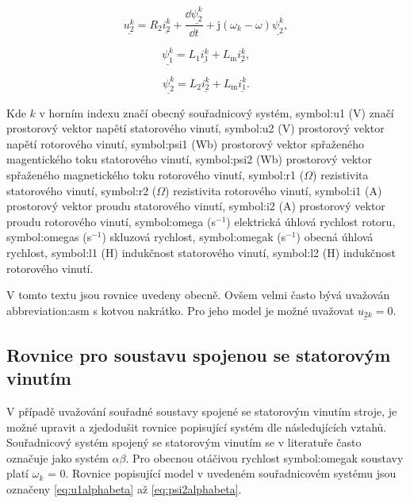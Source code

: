 \documentclass[a4paper, twoside, 11pt]{article}
\begin{document}
    \begin{equation}
        \underline{u_{2}^{k}} = R_2 \underline{i_2^{k}} + \frac{\dd{\underline{\psi_2^{k}}}}{\dd{t}} + \text{j} (\omega_k - \omega) \underline{\psi_2^{k}},
    \end{equation}

    \begin{equation}
        \underline{\psi_1^{k}} = L_1 \underline{i_1^{k}} + L_\text{m} \underline{i_2^{k}},
    \end{equation}

    \begin{equation}
        \underline{\psi_2^{k}} = L_2 \underline{i_2^{k}} + L_\text{m} \underline{i_1^{k}}.
    \end{equation}

    Kde $k$ v horním indexu značí obecný souřadnicový systém, \gls{symbol:u1} (V) značí prostorový vektor napětí statorového vinutí, \gls{symbol:u2} (V) prostorový vektor napětí rotorového vinutí, \gls{symbol:psi1} (Wb) prostorový vektor spřaženého magentického toku statorového vinutí, \gls{symbol:psi2} (Wb) prostorový vektor spřaženého magnetického toku rotorového vinutí, \gls{symbol:r1} ($\Omega$) rezistivita statorového vinutí, \gls{symbol:r2} ($\Omega$) rezistivita rotorového vinutí, \gls{symbol:i1} (A) prostorový vektor proudu statorového vinutí, \gls{symbol:i2} (A) prostorový vektor proudu rotorového vinutí, \gls{symbol:omega} (s$^{-1}$) elektrická úhlová rychlost rotoru, \gls{symbol:omegas} (s$^{-1}$) skluzová rychlost, \gls{symbol:omegak} (s$^{-1}$) obecná úhlová rychlost, \gls{symbol:l1} (H) indukčnost statorového vinutí, \gls{symbol:l2} (H) indukčnost rotorového vinutí.\par

    V tomto textu jsou rovnice uvedeny obecně. Ovšem velmi často bývá uvažován \gls{abbreviation:asm} s kotvou nakrátko. Pro jeho model je možné uvažovat $\underline{u_{2k}} = 0$.\par


    \subsection{Rovnice pro soustavu spojenou se statorovým vinutím}
    V případě uvažování souřadné soustavy spojené se statorovým vinutím stroje, je možné upravit a zjedodušit rovnice popisující systém dle následujících vztahů. Souřadnicový systém spojený se statorovým vinutím se v literatuře často označuje jako systém $\alpha\beta$. Pro obecnou otáčivou rychlost \gls{symbol:omegak} soustavy platí $\omega_k$ = 0. Rovnice popisující model v uvedeném souřadnicovém systému jsou označeny \ref{eq:u1alphabeta} až \ref{eq:psi2alphabeta}.
\end{document}
